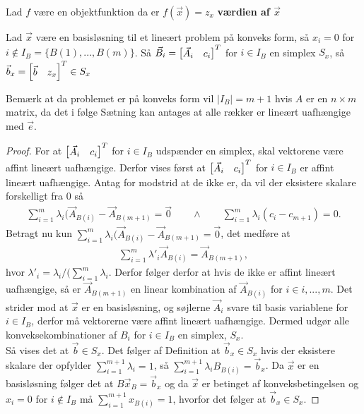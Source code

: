 \begin{defn}
Lad $f$ være en objektfunktion da er $f(\vec{x}) = z_x$  \textbf{værdien af $\vec{x}$}
\end{defn}

\begin{stn}
Lad $\vec{x}$ være en basisløsning til et lineært problem på konveks form, så $x_i = 0$ for $i \notin I_B = \{B(1),..., B(m)\}$. Så  $\vec{B}_i  = \begin{bmatrix} \vec{A}_i & c_i \end{bmatrix}^T$ for $i \in I_B$ en simplex $S_x$, så $\vec{b}_x = \begin{bmatrix} \vec{b}& z_x \end{bmatrix}^T \in S_x$
\end{stn}
Bemærk at da problemet er på konveks form vil $|I_B| = m+1$ hvis $A$ er en $n\times m$ matrix, da det i følge Sætning 
kan antages at alle rækker er lineært uafhængige med $\vec{e}$.
\begin{proof}
For at $\begin{bmatrix} \vec{A}_i & c_i \end{bmatrix}^T$ for $i \in I_B$ udspænder en simplex, skal vektorene være affint lineært uafhængige.
Derfor vises først at $\begin{bmatrix} \vec{A}_i & c_i \end{bmatrix}^T$ for $i \in I_B$ er affint lineært uafhængige.
Antag for modstrid at de ikke er, da vil der eksistere skalare forskelligt fra $0$ så
\begin{align*}
\sum_{i = 1}^{m} \lambda_i (\vec{A}_{B(i)} - \vec{A}_{B(m+1)} =  \vec{0} \qquad \wedge \qquad \sum_{i=1}^{m} \lambda_i (c_i - c_{m+1})= 0.
\end{align*}
Betragt nu kun $\sum_{i = 1}^{m} \lambda_i (\vec{A}_{B(i)} - \vec{A}_{B(m+1)} =  \vec{0}$, det medføre at
\begin{align*}
\sum_{i = 1}^{m} \lambda'_i \vec{A}_{B(i)} = \vec{A}_{B(m+1)},
\end{align*}
hvor $\lambda'_i = \lambda_i/(\sum_{i=1}^m \lambda_i$.
Derfor følger derfor at hvis de ikke er affint lineært uafhængige, så er $\vec{A}_{B(m+1)}$ en linear kombination af $\vec{A}_{B(i)}$ for $i  \in i,..., m$.
Det strider mod at $\vec{x}$ er en basisløsning, og søjlerne $\vec{A}_i$ svare til basis variablene for $i \in I_B$, derfor må vektorerne være affint lineært uafhængige. 
Dermed udgør alle konveksekombinationer af $B_i$ for $i \in I_B$ en simplex, $S_x$.
\\ Så vises det at $\vec{b} \in S_x$. 
Det følger af Definition
at $\vec{b}_x\in S_x$ hvis der eksistere skalare der opfylder $\sum_{i=1}^{m+1} \lambda_i = 1$, så $\sum_{i=1}^{m+1}\lambda_i B_{B(i)}  = \vec{b}_x$.
Da $\vec{x}$ er en basisløsning følger det at $B \vec{x}_B = \vec{b}_x$ og da $\vec{x}$ er betinget af konveksbetingelsen og $x_i = 0 $ for $i \notin I_B$ må $\sum_{i=1}^{m+1} x_{B(i)} = 1$, hvorfor det følger at $\vec{b}_x \in S_x$.
\end{proof}

